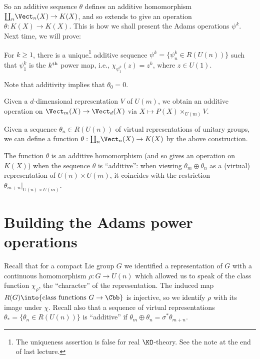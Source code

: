 So an additive sequence $\theta$ defines an additive homomorphism $\coprod_n\! \Vect_n(X) \to K(X)$, and so extends to give an operation $\theta:K(X)\to K(X)$.
This is how we shall present the Adams operations $\psi^k$. Next time, we will prove:
\begin{thm}
For $k \ge 1$, there is a unique\footnote{The uniqueness assertion is false for real $\KO$-theory.  See the note at the end of last lecture.} additive sequence $\psi^k = \{\psi^k_n \in R(U(n))\}$ such that $\psi_1^k$ is the $k^\textup{th}$ power map, i.e., $\chi_{\psi^k_1}(z) = z^k$, where $z \in U(1)$.
\end{thm}
\begin{rem}
Note that additivity implies that $\theta_0 = 0$.
\end{rem}

\fi
\begin{SummaryNote}
\Bullet Given a $d$-dimensional representation $V$ of $U(m)$, we obtain an additive operation on $\Vect_m(X)\to\Vect_d(X)$ via $X\mapsto P(X)\times_{U(m)}V$.

\Bullet Given a sequence $\theta_n\in R(U(n))$ of virtual representations of unitary groups, we can define a function $\theta:\coprod_n\!\Vect_n(X)\to K(X)$ by the above construction.

\Bullet The function $\theta$ is an additive homomorphism (and so gives an operation on $K(X)$) when the sequence $\theta$ is ``additive'': when viewing $\theta_m\oplus\theta_n$ as a (virtual) representation of $U(n)\times U(m)$, it coincides with the restriction $\theta_{m+n}|_{U(n)\times U(m)}$.
\end{SummaryNote}

\section{Building the Adams power operations} %
\label{BuildingTheAdamsPowerOperations}
\ifx\OutputBuildingTheAdamsPowerOperations\undefined\else
Recall that for a compact Lie group $G$ we identified a representation of $G$ with a continuous homomorphism $\rho: G \to U(n)$ which allowed us to speak of the class function $\chi_\rho$, the ``character'' of the representation.  The induced map $R(G) \into \{\hbox{class functions $G \to \Cbb$}\}$ is injective, so we identify $\rho$ with its image under $\chi$.  Recall also that a sequence of virtual representations $\theta_* = \{\theta_n \in R(U(n))\}$ is ``additive'' if $\theta_m \oplus \theta_n = \sigma^* \theta_{m+n}$.

